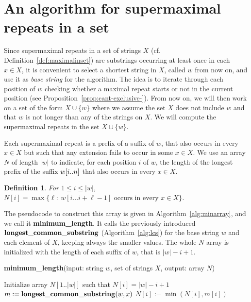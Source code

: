 \documentclass[submission]{dmtcs}
\newcommand\+[1]{\mathcal{#1}}
\newtheorem{definition}[theorem]{Definition}
\begin{document}
\section{An algorithm for supermaximal repeats in a set}\label{sec:inset}

Since supermaximal repeats in a set of strings $X$ 
(cf. Definition~\ref{def:maximalinset}) are substrings occurring 
at least once in each $x \in X$, it is convenient to select 
a shortest string in $X$, called $w$ from now on, 
and use it as {\em base string} for the algorithm.
The idea is to iterate through
each position of $w$ checking whether a maximal repeat starts 
or not in the current position (see Proposition~\ref{prop:cant-exclusive-}).
From now on, we will then work on a set of the form $X \cup \{w\}$ where
we assume the set $X$ does not include $w$ and that $w$ is not longer than
any of the strings on $X$. We will compute the supermaximal repeats in the set
$X \cup \{w\}$.

Each supermaximal repeat is a prefix of a suffix of $w$, that also occurs
in every  $x\in X$ but such that any extension fails to occur 
in some $x\in X$.
We use an array $N$ of length $|w|$ to indicate, for each 
position $i$ of $w$, the length of the longest prefix of the suffix $w[i..n]$
that also occurs in every $x\in X$.

\begin{definition}\label{def:N}
For $1\leq i \leq |w|$,
$N[i]=\max\{\ell :  \  w[i...i+ \ell-1] \text{ occurs in every } x\in X\}$.
\end{definition}

The pseudocode  to construct this array is given in 
Algorithm~\ref{alg:minarray}, and we call it {\bf minimum\_length}.
It calls the previously introduced
${\bf longest\_common\_substring}$ (Algorithm~\ref{alg:lcs})
for the base string $w$ and  each 
element of $X$, keeping always the smaller values.
The whole $N$ array is initialized with the length of each suffix
of $w$, that is $|w|-i+1$.  


\begin{algorithm}[th]
\caption{{\bf minimum\_length}(input: string $w$, set of strings $X$,   
output: array $N$)}
\label{alg:minarray}
\begin{algorithmic}
\STATE
\STATE  Initialize array $N[1..|w|]$ such that $N[i] = |w|-i+1$ 
	\STATE $m := {\bf longest\_common\_substring}(w,x)$
		\STATE $N[i] := \min(N[i],m[i])$
	\ENDFOR
\ENDFOR
\STATE
\end{algorithmic}
\end{algorithm}
\end{document}
